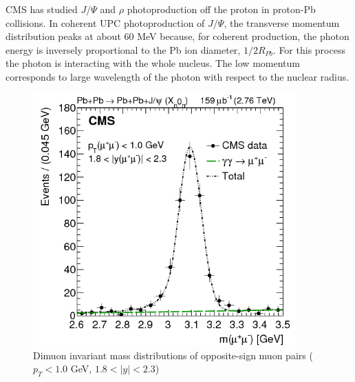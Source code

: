 CMS has studied $J/\Psi$ and $\rho$ photoproduction off the proton in proton-Pb collisions. In coherent UPC photoproduction of $J/\Psi$, the transverse momentum distribution peaks at about 60 MeV because, for coherent production, the photon energy is inversely proportional to the Pb ion diameter, $1/2R_{Pb}$. For this process the photon is interacting with the whole nucleus. The low momentum corresponds to large wavelength of the photon with respect to the nuclear radius. 
\begin{figure}[h!]
\begin{centering}
\includegraphics[width=4in]{Chapter2/importfigs/patkenny_Figure_001-a.png}
\par\end{centering}
\caption{Dimuon invariant mass distributions of opposite-sign muon pairs ($p_T<1.0$ GeV, $1.8<|y|<2.3$) \cite{Khachatryan:2016qhq}\label{fig:pk3}}
\end{figure}

